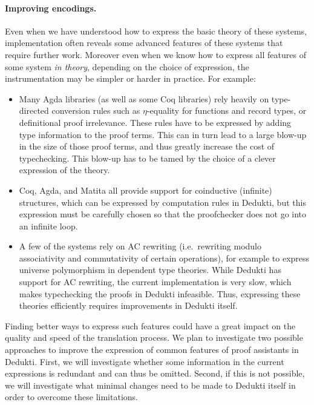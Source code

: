 \paragraph*{Improving encodings.}
Even when we have understood how to express the basic theory of these
systems, implementation often reveals some advanced features of these
systems that require further work.  Moreover even when we know how to
express all features of some system \emph{in theory}, depending on the
choice of expression, the instrumentation may be simpler or harder in
practice. For example:
\begin{itemize}

\item Many Agda libraries (as well as some Coq libraries) rely heavily
  on type-directed conversion rules such as $\eta$-equality for functions
  and record types, or definitional proof irrelevance. These rules
  have to be expressed by adding type information to the
  proof terms. This can in turn lead to a large blow-up in the size of
  those proof terms, and thus greatly increase the cost of
  typechecking. This blow-up has to be tamed by the choice of a
  clever expression of the theory.

\item Coq, Agda, and Matita all provide support for coinductive
  (infinite) structures, which can be expressed by computation rules in
  Dedukti, but this expression must be carefully chosen so that the
  proofchecker does not go into an infinite loop.

\item A few of the systems rely on AC rewriting (i.e.~rewriting modulo
  associativity and commutativity of certain operations), for example
  to express universe polymorphism in dependent type theories. While
  Dedukti has support for AC rewriting, the current implementation is
  very slow, which makes typechecking the proofs in Dedukti
  infeasible. Thus, expressing these theories efficiently requires improvements in
  Dedukti itself.
\end{itemize}

Finding better ways to express such features could have a great impact
on the quality and speed of the translation process.  We plan to
investigate two possible approaches to improve the expression of
common features of proof assistants in Dedukti. First, we will
investigate whether some information in the current expressions is
redundant and can thus be omitted. Second, if this is not possible, we
will investigate what minimal changes need to be made to Dedukti
itself in order to overcome these limitations.

